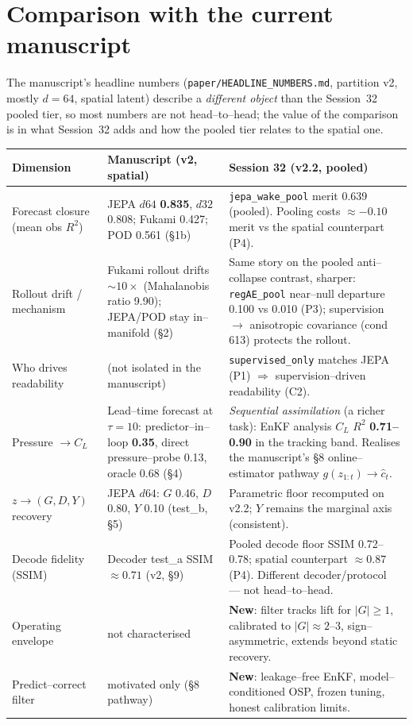 \documentclass[11pt]{article}
\begin{document}
\section{Comparison with the current manuscript}

The manuscript's headline numbers (\texttt{paper/HEADLINE\_NUMBERS.md}, partition v2, mostly
$d{=}64$, spatial latent) describe a \emph{different object} than the Session~32 pooled tier, so
most numbers are not head--to--head; the value of the comparison is in what Session~32 adds and
how the pooled tier relates to the spatial one.

\begin{center}
\begin{longtable}{@{}p{3.1cm}p{5.0cm}p{5.6cm}@{}}
\toprule
Dimension & Manuscript (v2, spatial) & Session 32 (v2.2, pooled) \\
\midrule
Forecast closure (mean obs $R^2$) & JEPA $d64$ \textbf{0.835}, $d32$ 0.808; Fukami 0.427; POD 0.561 (\S1b) & \texttt{jepa\_wake\_pool} merit 0.639 (pooled). Pooling costs $\approx -0.10$ merit vs the spatial counterpart (P4). \\
\addlinespace
Rollout drift / mechanism & Fukami rollout drifts $\sim 10\times$ (Mahalanobis ratio 9.90); JEPA/POD stay in--manifold (\S2) & Same story on the pooled anti--collapse contrast, sharper: \texttt{regAE\_pool} near--null departure 0.100 vs 0.010 (P3); supervision $\to$ anisotropic covariance (cond 613) protects the rollout. \\
\addlinespace
Who drives readability & (not isolated in the manuscript) & \texttt{supervised\_only} matches JEPA (P1) $\Rightarrow$ supervision--driven readability (C2). \\
\addlinespace
Pressure $\to C_L$ & Lead--time forecast at $\tau{=}10$: predictor--in--loop \textbf{0.35}, direct pressure--probe 0.13, oracle 0.68 (\S4) & \emph{Sequential assimilation} (a richer task): EnKF analysis $C_L$ $R^2$ \textbf{0.71--0.90} in the tracking band. Realises the manuscript's \S8 online--estimator pathway $g(z_{1:t})\to\hat c_t$. \\
\addlinespace
$z\to(G,D,Y)$ recovery & JEPA $d64$: $G$ 0.46, $D$ 0.80, $Y$ 0.10 (test\_b, \S5) & Parametric floor recomputed on v2.2; $Y$ remains the marginal axis (consistent). \\
\addlinespace
Decode fidelity (SSIM) & Decoder test\_a SSIM $\approx 0.71$ (v2, \S9) & Pooled decode floor SSIM 0.72--0.78; spatial counterpart $\approx 0.87$ (P4). Different decoder/protocol --- not head--to--head. \\
\addlinespace
Operating envelope & not characterised & \textbf{New}: filter tracks lift for $|G|\ge 1$, calibrated to $|G|\approx 2$--3, sign--asymmetric, extends beyond static recovery. \\
\addlinespace
Predict--correct filter & motivated only (\S8 pathway) & \textbf{New}: leakage--free EnKF, model--conditioned OSP, frozen tuning, honest calibration limits. \\
\bottomrule
\end{longtable}
\end{center}
\end{document}
